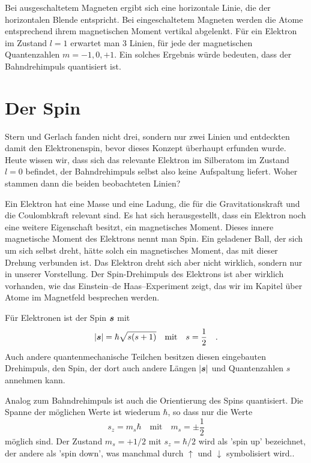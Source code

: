 Bei ausgeschaltetem Magneten ergibt sich eine horizontale Linie, die der horizontalen Blende entspricht. Bei eingeschaltetem Magneten werden die Atome entsprechend ihrem magnetischen Moment vertikal abgelenkt.
 Für ein Elektron im Zustand $l=1$ erwartet man 3 Linien, für jede der  magnetischen Quantenzahlen $m=-1, 0, +1$. Ein solches Ergebnis würde bedeuten, dass der Bahndrehimpuls quantisiert ist.

\section{Der Spin}

Stern und Gerlach fanden nicht drei, sondern nur zwei Linien und entdeckten damit den Elektronenspin, bevor dieses Konzept überhaupt erfunden wurde. Heute wissen wir, dass sich das relevante Elektron im Silberatom im Zustand $l=0$ befindet, der Bahndrehimpuls selbst also keine Aufspaltung liefert. Woher stammen dann die beiden beobachteten Linien?

Ein Elektron hat eine Masse und eine Ladung, die für die Gravitationskraft und die Coulombkraft relevant sind. Es hat sich herausgestellt, dass ein Elektron noch eine weitere Eigenschaft besitzt, ein magnetisches Moment. Dieses innere magnetische Moment des Elektrons nennt man Spin.  Ein geladener Ball, der sich um sich selbst dreht, hätte solch ein magnetisches Moment, das mit dieser Drehung verbunden ist. Das Elektron dreht sich aber nicht wirklich, sondern nur in
unserer Vorstellung. Der Spin-Drehimpuls des Elektrons ist aber wirklich vorhanden, wie das Einstein--de Haas--Experiment zeigt, das wir im Kapitel über Atome im Magnetfeld besprechen werden.

Für Elektronen ist der Spin $\boldsymbol{s}$ mit
\begin{equation}
    | \boldsymbol{s} | = \hbar \sqrt{s (s+1)} \quad \text{mit} \quad s = \frac{1}{2} \quad .
\end{equation}
Auch andere quantenmechanische Teilchen besitzen diesen eingebauten Drehimpuls, den Spin, der dort auch andere Längen $ | \boldsymbol{s} |$ und Quantenzahlen $s$ annehmen kann.

Analog zum Bahndrehimpuls ist auch die Orientierung des Spins quantisiert. Die Spanne der möglichen Werte ist wiederum $\hbar$, so dass nur die Werte 
\begin{equation}
   s_z = m_s \hbar \quad \text{mit} \quad m_s = \pm \frac{1}{2}
\end{equation}
möglich sind. Der Zustand $m_s = + 1/2$ mit $s_z = \hbar /2$ wird als 'spin up' bezeichnet, der andere als 'spin down', was manchmal durch $\uparrow$ und $\downarrow$ symbolisiert wird..


